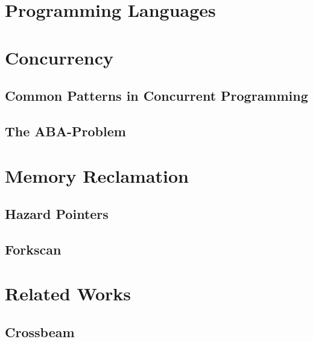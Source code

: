 \section{Programming Languages}
\lorem{}


\section{Concurrency}
\lorem{}

\subsection{Common Patterns in Concurrent Programming\label{sec:common-patterns}}
\lorem{}

\subsection{The ABA-Problem\label{sec:aba-problem}}


\section{Memory Reclamation}
\lorem{}

\subsection{Hazard Pointers\label{sec:hazard-pointers}}
\lorem{}

\subsection{Forkscan\label{sec:forkscan}}
\lorem{}


\section{Related Works}
\lorem{}

\subsection{Crossbeam}
\lorem{}
